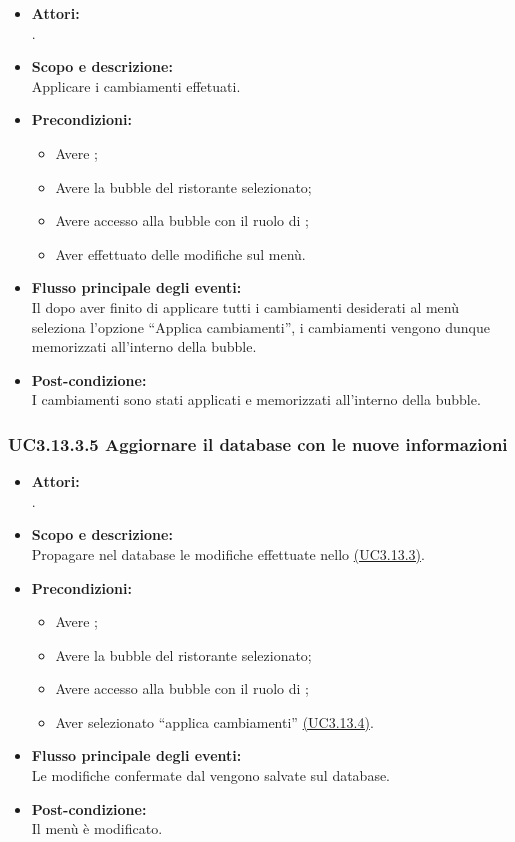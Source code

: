 \begin{itemize}
	\item \textbf{Attori:}
	\\.
	\item \textbf{Scopo e descrizione:} 
	\\Applicare i cambiamenti effetuati.
	\item \textbf{Precondizioni:}
	\begin{itemize}
		\item Avere ;
		\item Avere la bubble del ristorante selezionato;
		\item Avere accesso alla bubble con il ruolo di ;
		\item Aver effettuato delle modifiche sul menù.
	\end{itemize}
	\item \textbf{Flusso principale degli eventi:}
	\\Il {} dopo aver finito di applicare tutti i cambiamenti desiderati al menù seleziona l’opzione “Applica cambiamenti”, i cambiamenti vengono dunque memorizzati all’interno della bubble.
	\item \textbf{Post-condizione:}
	\\I cambiamenti sono stati applicati e memorizzati all’interno della bubble.
\end{itemize}

\subsubsection{UC3.13.3.5 Aggiornare il database con le nuove informazioni} \label{UC3.13.3.5}

\begin{itemize}
	\item \textbf{Attori:}
	\\.
	\item \textbf{Scopo e descrizione:} 
	\\Propagare nel database le modifiche effettuate nello \hyperref[UC3.13.3]{(UC3.13.3)}.
	\item \textbf{Precondizioni:}
	\begin{itemize}
		\item Avere ;
		\item Avere la bubble del ristorante selezionato;
		\item Avere accesso alla bubble con il ruolo di ;
		\item Aver selezionato “applica cambiamenti” \hyperref[UC3.13.4]{(UC3.13.4)}.
	\end{itemize}
	\item \textbf{Flusso principale degli eventi:}
	\\Le modifiche confermate dal  vengono salvate sul database.
	\item \textbf{Post-condizione:}
	\\Il menù è modificato.
\end{itemize}

